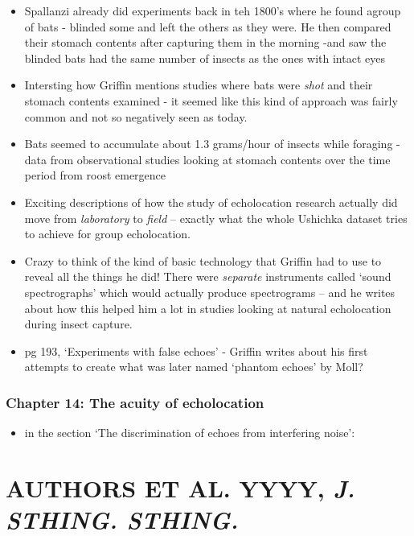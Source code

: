 \documentclass[
]{book}
\providecommand{\tightlist}{%
  \setlength{\itemsep}{0pt}\setlength{\parskip}{0pt}}
\begin{document}
\begin{itemize}
\item
  Spallanzi already did experiments back in teh 1800's where he found agroup of bats - blinded some and left the others as they were. He then compared their stomach contents after capturing them in the morning -and saw the blinded bats had the same number of insects as the ones with intact eyes
\item
  Intersting how Griffin mentions studies where bats were \emph{shot} and their stomach contents examined - it seemed like this kind of approach was fairly common and not so negatively seen as today.
\item
  Bats seemed to accumulate about 1.3 grams/hour of insects while foraging - data from observational studies looking at stomach contents over the time period from roost emergence
\item
  Exciting descriptions of how the study of echolocation research actually did move from \emph{laboratory} to \emph{field} -- exactly what the whole Ushichka dataset tries to achieve for group echolocation.
\item
  Crazy to think of the kind of basic technology that Griffin had to use to reveal all the things he did! There were \emph{separate} instruments called `sound spectrographs' which would actually produce spectrograms -- and he writes about how this helped him a lot in studies looking at natural echolocation during insect capture.
\item
  pg 193, `Experiments with false echoes' - Griffin writes about his first attempts to create what was later named `phantom echoes' by Moll?
\end{itemize}

\hypertarget{chapter-14-the-acuity-of-echolocation}{%
\subsection{Chapter 14: The acuity of echolocation}\label{chapter-14-the-acuity-of-echolocation}}

\begin{itemize}
\tightlist
\item
  in the section `The discrimination of echoes from interfering noise':
\end{itemize}

\hypertarget{authors-et-al.-yyyy-j.-sthing.-sthing.}{%
\chapter{\texorpdfstring{AUTHORS ET AL. YYYY, \emph{J. STHING. STHING.}}{AUTHORS ET AL. YYYY, J. STHING. STHING.}}\label{authors-et-al.-yyyy-j.-sthing.-sthing.}}
\end{document}
